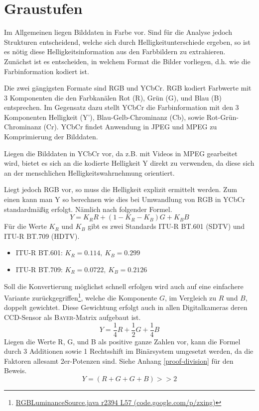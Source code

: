 \section{Graustufen}
\writtenby{\dcauthornameewie}%
Im Allgemeinen liegen Bilddaten in Farbe vor.
Sind für die Analyse jedoch Strukturen entscheidend, welche sich durch Helligkeitunterschiede ergeben, so ist es nötig diese Helligkeitsinformation aus den Farbbildern zu extrahieren.
Zunächst ist es entscheiden, in welchem Format die Bilder vorliegen, d.h. wie die Farbinformation kodiert ist.

Die zwei gängigsten Formate sind RGB und YCbCr.
RGB kodiert Farbwerte mit 3 Komponenten die den Farbkanälen Rot (R), Grün (G), und Blau (B) entsprechen.
Im Gegensatz dazu stellt YCbCr die Farbinformation mit den 3 Komponenten Helligkeit (Y'), Blau-Gelb-Chrominanz (Cb), sowie Rot-Grün-Chrominanz (Cr).
YCbCr findet Anwendung in JPEG und MPEG zu Komprimierung der Bilddaten.

Liegen die Bilddaten in YCbCr vor, da z.B. mit Videos in MPEG gearbeitet wird, bietet es sich an die kodierte Helligkeit Y direkt zu verwenden, da diese sich an der menschlichen Helligkeitswahrnehmung orientiert.

Liegt jedoch RGB vor, so muss die Helligkeit explizit ermittelt werden.
Zum einen kann man Y so berechnen wie dies bei Umwandlung von RGB in YCbCr standardmäßig erfolgt.
Nämlich nach folgender Formel.
  \[ Y = K_R R + (1 - K_R - K_B) G + K_B B \]
Für die Werte $K_R$ und $K_B$ gibt es zwei Standards ITU-R BT.601 (SDTV) und ITU-R BT.709 (HDTV).
%
\begin{itemize}
\item ITU-R BT.601: $K_R=0.114,~K_B=0.299$
\item ITU-R BT.709: $K_R=0.0722,~K_B=0.2126$
\end{itemize}
%
Soll die Konvertierung möglichst schnell erfolgen wird auch auf eine einfachere Variante zurückgegriffen\footnote{\href{https://code.google.com/p/zxing/source/browse/trunk/core/src/com/google/zxing/RGBLuminanceSource.java?spec=svn2633&r=2394\#57}{RGBLuminanceSource.java r2394 L57 (code.google.com/p/zxing)}}, welche die Komponente $G$, im Vergleich zu $R$ und $B$, doppelt gewichtet.
Diese Gewichtung erfolgt auch in allen Digitalkameras deren CCD-Sensor als \textsc{Bayer}-Matrix aufgebaut ist.
  \[ Y = \frac{1}{4} R + \frac{1}{2} G + \frac{1}{4}B \]
Liegen die Werte R, G, und B als positive ganze Zahlen vor, kann die Formel durch 3 Additionen sowie 1 Rechtsshift im Binärsystem umgesetzt werden, da die Faktoren allesamt 2er-Potenzen sind.
Siehe Anhang \ref{proof-division} für den Beweis.
  \[ Y = (R + G + G + B) >\!\!> 2 \]
